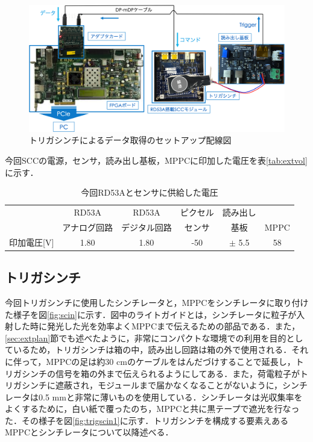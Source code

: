 \begin{figure}[h]
  \centering
  \includegraphics[width=15cm]{./figure/extsetupcab.png}
  \caption{トリガシンチによるデータ取得のセットアップ配線図}
  \label{fig:extsetupcab}
\end{figure}

今回SCCの電源，センサ，読み出し基板，MPPCに印加した電圧を表\ref{tab:extvol}に示す．
\begin{table}[h]
  \centering
  \caption{今回RD53Aとセンサに供給した電圧}
  \begin{tabular} {|l|cc|c|c|c|} \hline
     & RD53A & RD53A & ピクセル & 読み出し & \\ 
     & アナログ回路 & デジタル回路 & センサ & 基板 & MPPC \\ \hline
    印加電圧[$\mathrm{V}$] & 1.80 & 1.80 & -50 & $\pm$ 5.5 & 58\\ \hline
  \end{tabular}
  \label{tab:voltage}
\end{table}


\subsection{トリガシンチ}
今回トリガシンチに使用したシンチレータと，MPPCをシンチレータに取り付けた様子を図\ref{fig:scin}に示す．図中のライトガイドとは，シンチレータに粒子が入射した時に発光した光を効率よくMPPCまで伝えるための部品である．また，\ref{sec:extplan}節でも述べたように，非常にコンパクトな環境での利用を目的としているため，トリガシンチは箱の中，読み出し回路は箱の外で使用される．それに伴って，MPPCの足は約30 $\mathrm{cm}$のケーブルをはんだづけすることで延長し，トリガシンチの信号を箱の外まで伝えられるようにしてある．また，荷電粒子がトリガシンチに遮蔽され，モジュールまで届かなくなることがないように，シンチレータは0.5 $\mathrm{mm}$と非常に薄いものを使用している．シンチレータは光収集率をよくするために，白い紙で覆ったのち，MPPCと共に黒テープで遮光を行なった．その様子を図\ref{fig:trigscin1}に示す．トリガシンチを構成する要素えあるMPPCとシンチレータについて以降述べる．

